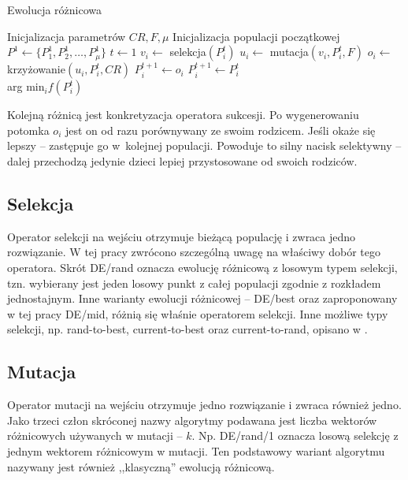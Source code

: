 \documentclass[a4paper,onecolumn,oneside,12pt,wide,floatssmall]{mwrep}
\theoremstyle{definition}
\theoremstyle{plain}%
\theoremstyle{remark}
\begin{document}
\begin{algorithm}[H]
\caption{Ewolucja różnicowa}
\label{algorithm:de}
\begin{algorithmic}[1]
\State Inicjalizacja parametrów $CR, F, \mu$
\State Inicjalizacja populacji początkowej $P^1 \gets \{P^1_1, P^1_2, \ldots, P^1_\mu\}$
\State $t \gets 1$
    \State $v_i \gets$ selekcja$(P^t_i)$
    \State $u_i \gets$ mutacja$(v_i, P^t_i, F)$ 
    \State $o_i \gets$ krzy{\.z}owanie$(u_i, P_i^t, CR)$    
        
      \State $P_i^{t+1} \gets o_i$     
    \Else 
      \State $P_i^{t+1} \gets P_i^{t}$
    \EndIf {}
  \EndFor
\EndWhile \\
\Return arg min$_i f(P^t_i)$ 
\end{algorithmic}

\end{algorithm}

Kolejną różnicą jest konkretyzacja operatora sukcesji. Po wygenerowaniu potomka
$o_i$ jest on od razu porównywany ze swoim rodzicem. Jeśli okaże się lepszy -- zastępuje go
w~kolejnej populacji. Powoduje to silny nacisk selektywny -- dalej przechodzą jedynie dzieci
lepiej przystosowane od swoich rodziców.

\subsection{Selekcja}

Operator selekcji na wejściu otrzymuje bieżącą populację i zwraca jedno rozwiązanie.
W tej pracy zwrócono szczególną uwagę na właściwy dobór tego operatora.
Skrót DE/rand oznacza ewolucję różnicową z losowym typem selekcji, tzn. wybierany jest jeden
losowy punkt z całej populacji zgodnie z rozkładem jednostajnym.
Inne warianty ewolucji różnicowej -- DE/best oraz zaproponowany w tej pracy DE/mid, 
różnią się właśnie operatorem selekcji. Inne możliwe typy selekcji, 
np. rand-to-best, current-to-best oraz current-to-rand,
opisano w \cite{zaharie}.

\subsection{Mutacja}

Operator mutacji na wejściu otrzymuje jedno rozwiązanie i zwraca również jedno.
Jako trzeci człon skróconej nazwy algorytmy
podawana jest liczba wektorów różnicowych używanych w mutacji -- $k$.
Np. DE/rand/1 oznacza losową selekcję z jednym wektorem różnicowym w mutacji.
Ten podstawowy wariant algorytmu nazywany jest również ,,klasyczną'' ewolucją różnicową. 
\end{document}
